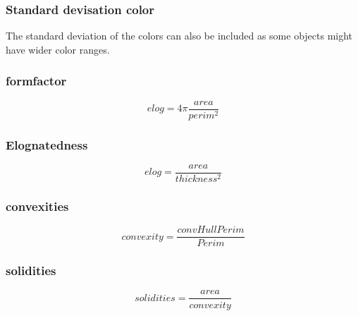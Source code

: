 \subsubsection{Standard devisation color}

The standard deviation of the colors can also be included as some objects might have wider color ranges.

\subsubsection{formfactor}

\begin{equation}
    elog = 4\pi\frac{area}{perim^2}
\end{equation}

\subsubsection{Elognatedness}

\begin{equation}
    elog = \frac{area}{thickness^2}
\end{equation}

\subsubsection{convexities}

\begin{equation}
    convexity = \frac{convHullPerim}{Perim}
\end{equation}

\subsubsection{solidities}

\begin{equation}
    solidities = \frac{area}{convexity}
\end{equation}

